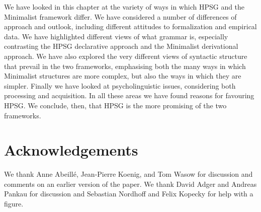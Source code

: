 \documentclass[output=paper
 	        ,biblatex
                ,babelshorthands
                ,newtxmath
                ,draftmode
                ,colorlinks, citecolor=brown
]{langscibook}
\begin{document}
We have looked in this chapter at the variety of ways in which HPSG and the Minimalist framework
differ. We have considered a number of differences of approach and outlook, including different
attitudes to formalization and empirical data. We have highlighted different views of what grammar
is, especially contrasting the HPSG declarative approach and the Minimalist derivational
approach. We have also explored the very different views of syntactic structure that prevail in the
two frameworks, emphasising both the many ways in which Minimalist structures are more complex, but
also the ways in which they are simpler. Finally we have looked at psycholinguistic issues, considering
both processing and acquisition. In all these areas we have found reasons for favouring HPSG. We
conclude, then, that HPSG is the more promising of the two frameworks.



\section*{Acknowledgements}

We thank Anne Abeillé, Jean-Pierre Koenig, and Tom Wasow for discussion and comments on an earlier
version of the paper. We thank David Adger and Andreas Pankau for discussion and Sebastian Nordhoff
and Felix Kopecky for help with a figure.



\end{document}
